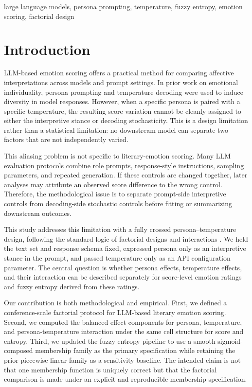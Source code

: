 \documentclass[conference]{IEEEtran}
\begin{document}
\begin{IEEEkeywords}
large language models, persona prompting, temperature, fuzzy entropy, emotion scoring, factorial design
\end{IEEEkeywords}

\section{Introduction}
LLM-based emotion scoring offers a practical method for comparing affective interpretations across models and prompt settings.
In prior work on emotional individuality, persona prompting and temperature decoding were used to induce diversity in model responses.
However, when a specific persona is paired with a specific temperature, the resulting score variation cannot be cleanly assigned to either the interpretive stance or decoding stochasticity.
This is a design limitation rather than a statistical limitation: no downstream model can separate two factors that are not independently varied.

This aliasing problem is not specific to literary-emotion scoring.
Many LLM evaluation protocols combine role prompts, response-style instructions, sampling parameters, and repeated generation.
If these controls are changed together, later analyses may attribute an observed score difference to the wrong control.
Therefore, the methodological issue is to separate prompt-side interpretive controls from decoding-side stochastic controls before fitting or summarizing downstream outcomes.

This study addresses this limitation with a fully crossed persona–temperature design, following the standard logic of factorial designs and interactions \cite{montgomery2019design}.
We held the text set and response schema fixed, expressed persona only as an interpretive stance in the prompt, and passed temperature only as an API configuration parameter.
The central question is whether persona effects, temperature effects, and their interaction can be described separately for score-level emotion ratings and fuzzy entropy derived from these ratings.

Our contribution is both methodological and empirical.
First, we defined a conference-scale factorial protocol for LLM-based literary emotion scoring.
Second, we computed the balanced effect components for persona, temperature, and persona-temperature interaction under the same cell structure for score and entropy.
Third, we updated the fuzzy entropy pipeline to use a smooth sigmoid-composed membership family as the primary specification while retaining the prior piecewise-linear family as a sensitivity baseline.
The intended claim is not that one membership function is uniquely correct but that the factorial comparison is made under an explicit and reproducible membership specification.
\end{document}
